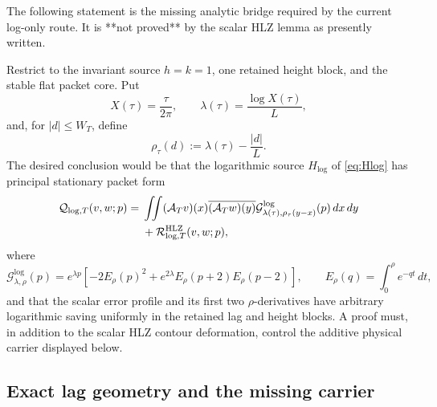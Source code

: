 \begin{proposition}
\label{prop:lagwise-packet-HLZ}
The following statement is the missing analytic bridge required by the current
log-only route.  It is **not proved** by the scalar HLZ lemma as presently
written.

Restrict to the invariant source $h=k=1$, one retained height block, and the
stable flat packet core. Put
\[
X(\tau)=\frac{\tau}{2\pi},\qquad
\lambda(\tau)=\frac{\log X(\tau)}L,
\]
and, for $|d|\le W_T$, define
\begin{equation}
\boxed{\rho_\tau(d):=\lambda(\tau)-\frac{|d|}{L}.}
\label{eq:lagwise-rho}
\end{equation}
The desired conclusion would be that the logarithmic source $H_{\log}$ of
\eqref{eq:Hlog} has principal stationary packet form
\begin{align}
\mathcal Q_{\log,T}(v,w;p)
={}&\iint
 (\mathcal A_Tv)(x)\overline{(\mathcal A_Tw)(y)}
 \mathcal G^{\log}_{\lambda(\tau),\rho_\tau(y-x)}(p)\,dx\,dy
\notag\\
&+\mathcal R^{\rm HLZ}_{\log,T}(v,w;p),
\label{eq:lagwise-HLZ-form}
\end{align}
where
\begin{equation}
\boxed{
\mathcal G^{\log}_{\lambda,\rho}(p)
=e^{\lambda p}\left[
-2E_\rho(p)^2
+e^{2\lambda}E_\rho(p+2)E_\rho(p-2)
\right],
\qquad
E_\rho(q)=\int_0^\rho e^{-qt}\,dt,
}
\label{eq:logonly-local-profile}
\end{equation}
and that the scalar error profile and its first two $\rho$-derivatives have
arbitrary logarithmic saving uniformly in the retained lag and height blocks.
A proof must, in addition to the scalar HLZ contour deformation, control the
additive physical carrier displayed below.
\end{proposition}

\subsection{Exact lag geometry and the missing carrier}

